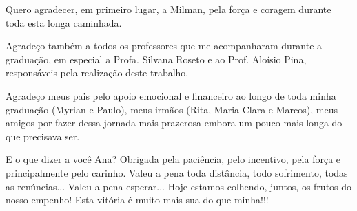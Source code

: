 Quero agradecer, em primeiro lugar, a Milman, pela força e coragem durante toda esta longa caminhada.

Agradeço também a todos os professores que me acompanharam durante a graduação, em especial a Profa. Silvana Roseto e ao Prof. Aloísio Pina, responsáveis pela realização deste trabalho.

Agradeço meus pais pelo apoio emocional e financeiro ao longo de toda minha graduação (Myrian e Paulo), meus irmãos (Rita, Maria Clara e Marcos), meus amigos por fazer dessa jornada mais prazerosa embora um pouco mais longa do que precisava ser.

E o que dizer a você Ana? 
Obrigada pela paciência, pelo incentivo, pela força e principalmente pelo carinho. 
Valeu a pena toda distância, todo sofrimento, todas as renúncias... Valeu a pena esperar... Hoje estamos colhendo, juntos, os frutos do nosso empenho!
Esta vitória é muito mais sua do que minha!!!